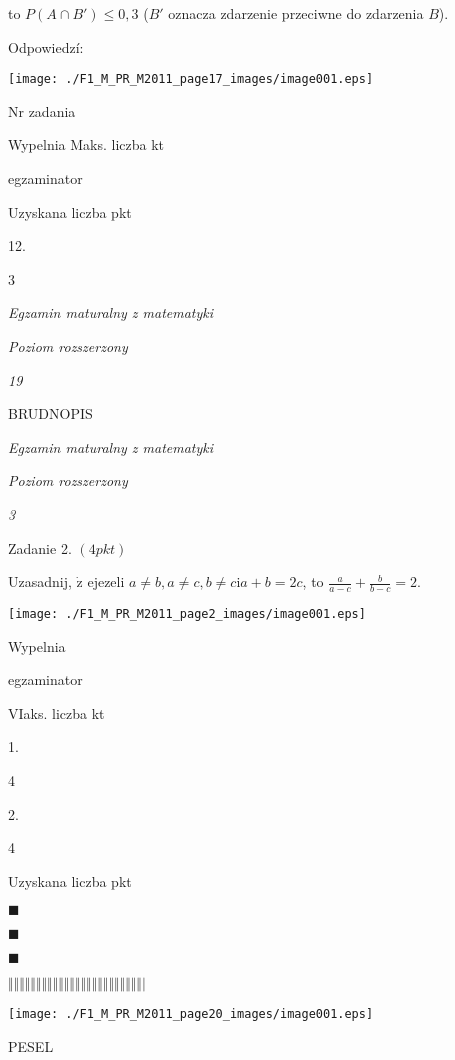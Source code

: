 \documentclass[a4paper,12pt]{article}
\begin{document}
to $P(A\cap B')\leq 0,3$ ($B'$ oznacza zdarzenie przeciwne do zdarzenia $B$).

Odpowiedzí:
\begin{center}
\texttt{[image: ./F1\_M\_PR\_M2011\_page17\_images/image001.eps]}
\end{center}
Nr zadania

Wypelnia Maks. liczba kt

egzaminator

Uzyskana liczba pkt

12.

3





{\it Egzamin maturalny z matematyki}

{\it Poziom rozszerzony}

{\it 19}

BRUDNOPIS










{\it Egzamin maturalny z matematyki}

{\it Poziom rozszerzony}

{\it 3}

Zadanie 2. $(4pkt)$

Uzasadnij, $\dot{\mathrm{z}}$ ejezeli $a\neq b, a\neq c, b\neq c\mathrm{i}a+b=2c$, to $\displaystyle \frac{a}{a-c}+\frac{b}{b-c}=2.$
\begin{center}
\texttt{[image: ./F1\_M\_PR\_M2011\_page2\_images/image001.eps]}
\end{center}
Wypelnia

egzaminator

VIaks. liczba kt

1.

4

2.

4

Uzyskana liczba pkt





$\blacksquare$

$\blacksquare$

$\blacksquare$

$\Vert\Vert\Vert\Vert\Vert\Vert\Vert\Vert\Vert\Vert\Vert\Vert\Vert\Vert\Vert\Vert\Vert\Vert\Vert\Vert\Vert\Vert\Vert\Vert|$
\begin{center}
\texttt{[image: ./F1\_M\_PR\_M2011\_page20\_images/image001.eps]}
\end{center}
PESEL
\end{document}
